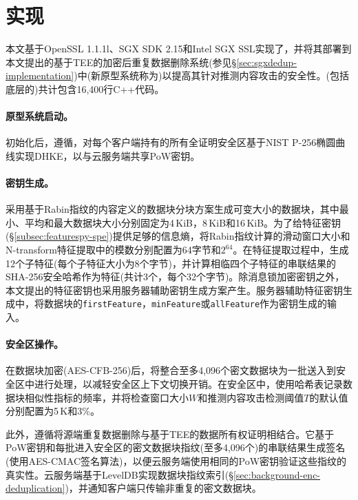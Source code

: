 \section{\prototype 实现}
\label{sec:featurespy-implementation}
本文基于OpenSSL 1.1.1l\cite{openssl}、SGX SDK 2.15\cite{sgxsdk}和Intel SGX SSL\cite{sgxssl}实现了\sysnameF，并将其部署到本文提出的基于TEE的加密后重复数据删除系统\sysnameS (参见\S\ref{sec:sgxdedup-implementation})中(新原型系统称为\prototype)以提高其针对推测内容攻击的安全性。\prototype(包括底层的\sysnameS )共计包含16,400行C++代码。

\paragraph*{原型系统启动。}
初始化后，\prototype 遵循\sysnameS，对每个客户端持有的所有全证明安全区基于NIST P-256椭圆曲线\cite{nist}实现DHKE，以与云服务端共享PoW密钥。

\paragraph*{密钥生成。}
\prototype 采用基于Rabin指纹\cite{rabin81}的内容定义的数据块分块方案生成可变大小的数据块，其中最小、平均和最大数据块大小分别固定为4\,KiB，8\,KiB和16\,KiB。为了给特征密钥(\S\ref{subsec:featurespy-spe})提供足够的信息熵，将Rabin指纹计算的滑动窗口大小和N-transform特征提取中的模数分别配置为64字节和$2^{64}$。在特征提取过程中，生成12个子特征(每个子特征大小为8个字节)，并计算相临四个子特征的串联结果的SHA-256安全哈希作为特征(共计3个，每个32个字节)。除消息锁加密密钥之外，本文提出的特征密钥也采用服务器辅助密钥生成方案产生。服务器辅助特征密钥生成中，将数据块的{\tt firstFeature}，{\tt minFeature}或{\tt allFeature}作为密钥生成的输入。

\paragraph*{安全区操作。}
在数据块加密(AES-CFB-256)后，\prototype 将整合至多4,096个密文数据块为一批送入到安全区中进行处理，以减轻安全区上下文切换开销\cite{arnautov2016SCONE}。在安全区中，\prototype 使用哈希表记录数据块相似性指标的频率，并将检查窗口大小$W$和推测内容攻击检测阈值$T$的默认值分别配置为5\,K和3\%。

此外，\prototype 遵循\sysnameS 将源端重复数据删除与基于TEE的数据所有权证明相结合。它基于PoW密钥和每批进入安全区的密文数据块指纹(至多4,096个)的串联结果生成签名(使用AES-CMAC签名算法)，以便云服务端使用相同的PoW密钥验证这些指纹的真实性。云服务端基于LevelDB\cite{leveldb}实现数据块指纹索引(\S\ref{sec:background-enc-deduplication})，并通知客户端只传输非重复的密文数据块。

